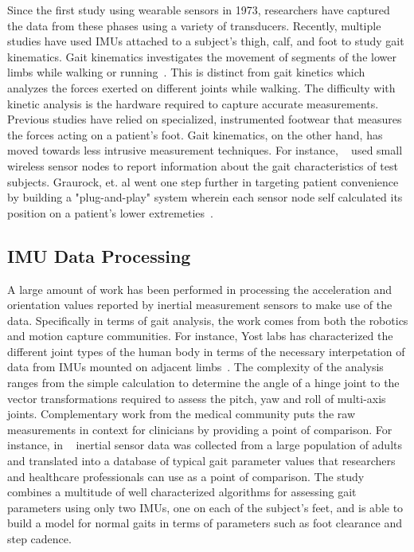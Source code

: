 \documentclass[conference]{IEEEtran}
\begin{document}
Since the first study using wearable sensors in 1973, researchers have captured the data
from these phases using a variety of transducers. Recently, multiple studies have used
IMUs attached to a subject’s thigh, calf, and foot to study gait kinematics. Gait
kinematics investigates the movement of segments of the lower limbs while walking or
running~\cite{run}. This is distinct from gait kinetics which analyzes the forces exerted on
different joints while walking. The difficulty with kinetic analysis is the hardware
required to capture accurate measurements. Previous studies have relied on specialized,
instrumented footwear that measures the forces acting on a patient’s foot. Gait
kinematics, on the other hand, has moved towards less intrusive measurement techniques.
For instance, ~\cite{walkers} used small wireless sensor nodes to report information about the gait
characteristics of test subjects. Graurock, et. al went one step further in targeting
patient convenience by building a "plug-and-play" system wherein each sensor node self
calculated its position on a patient's lower extremeties~\cite{pairing}.  

\subsection{IMU Data Processing}
A large amount of work has been performed in processing the acceleration and orientation
values reported by inertial measurement sensors to make use of the data. Specifically in
terms of gait analysis, the work comes from both the robotics and motion capture
communities. 
For instance, Yost labs has characterized the different joint types of the
human body in terms of the necessary interpetation of data from IMUs mounted on adjacent
limbs~\cite{yost}. The complexity of the analysis ranges from the simple calculation to
determine the angle of a hinge joint to the vector transformations required to assess the
pitch, yaw and roll of multi-axis joints. Complementary work from the medical community
puts the raw measurements in context for clinicians by providing a point of comparison.
For instance, in ~\cite{pop} inertial sensor data was collected from a large population
of adults and translated into a database of typical gait parameter values that researchers
and healthcare professionals can use as a point of comparison. The study combines a
multitude of well characterized algorithms for assessing gait parameters using only two
IMUs, one on each of the subject's feet, and is able to build a model for normal gaits
in terms of parameters such as foot clearance and step cadence. 
\end{document}
